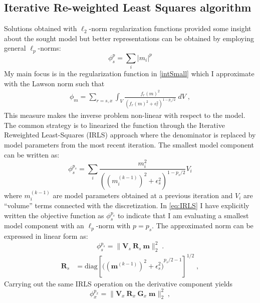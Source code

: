 \subsection{Iterative Re-weighted Least Squares algorithm}
Solutions obtained with $\ell_2$-norm regularization functions provided some insight about the sought model but better representations can be obtained by employing general $\ell_p$-norms:
\begin{equation} \label{eq:lpreg}
\phi_s^{p} = \sum_{i} {|m_i|}^{p}
\end{equation}
My main focus is in the regularization function in \eqref{intSmall} which I approximate with the Lawson norm such that
\begin{equation}\label{eq:IntegralIRLSLawson}
\begin{split}
	\phi_m = \sum_{r=s,x} \int_V{\frac{ {f_r (m)}^2}{\left( {{f_r (m)}}^{2} + \epsilon_r^2 \right)^{1-p_r/2 }}\;dV} \;,	
\end{split}
\end{equation}
This measure makes the inverse problem non-linear with respect to the model. The common strategy is to linearized the function through the Iterative Reweighted Least-Squares (IRLS) approach where the denominator is replaced by model parameters from the most recent iteration. The smallest model component can be written as:
\begin{equation} \label{eq:IRLS}
\phi_s^{p_s} = \sum_{i}\frac{m_i^2}{{{((m^{(k-1)}_i)^{2} + \epsilon_s^2 )}^{1-p_s/2}} }V_i
\end{equation}
where $m_i^{(k-1)}$ are model parameters obtained at a previous iteration and $V_i$ are “volume” terms connected with the discretization. In \eqref{eq:IRLS} I have explicitly written the objective function as $\phi_s^{p_s}$ to indicate that I am evaluating a smallest model component with an $\ell_p$-norm with
$p=p_s$.
The approximated norm can be expressed in linear form as:
\begin{equation}\label{IRLSphis}
\phi_s^{p_s} = \| \mathbf{V}_s\:\mathbf{R}_s\:\mathbf{m}\|_2^2 \;.
\end{equation}
\begin{equation}\label{eq:R_w}
\begin{split}
	\mathbf{R}_s &= \text{diag} \left[{\Big( {({\mathbf{m}}^{(k-1)})}^{2} + \epsilon_s^2 \Big)}^{p_s/2 - 1} \right]^{1/2} \;,
\end{split}
\end{equation}
Carrying out the same IRLS operation on the derivative component yields
\begin{equation}\label{phixMatrix}
\phi_x^{p_x} = \| \mathbf{V}_x\:\mathbf{R}_x\:\mathbf{G}_x\;\mathbf{m} \|_2^2\;,
\end{equation}
